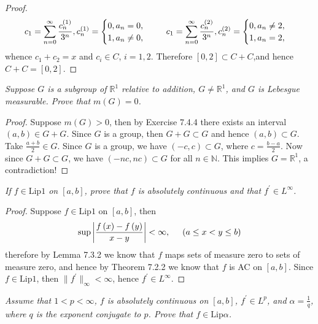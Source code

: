 \begin{proof}
$$
c_1=\sum_{n=0}^{\infty}{\frac{c_{n}^{\left( 1 \right)}}{3^n}},c_{n}^{\left( 1 \right)}=\begin{cases}
	0,a_n=0,\\
	1,a_n\ne 0,\\
\end{cases}\hspace{0.5cm}c_1=\sum_{n=0}^{\infty}{\frac{c_{n}^{\left( 2 \right)}}{3^n}},c_{n}^{\left( 2 \right)}=\begin{cases}
	0,a_n\ne 2,\\
	1,a_n=2,\\
\end{cases}
$$
whence $c_1+c_2=x$ and $c_i\in C$, $i=1,2$. Therefore $[0,2]\subset C+C$,and hence $C+C=[0,2]$.
\end{proof}
\begin{problem}\em
Suppose $G$ is a subgroup of $\mathbb{R}^1$ relative to addition, $G\ne\mathbb{R}^1$, and $G$ is Lebesgue measurable. Prove that $m(G)=0$.
\end{problem}
\begin{proof}
Suppose $m(G)>0$, then by Exercise 7.4.4 there exists an interval $(a,b)\in G+G$. Since $G$ is a group, then $G+G\subset G$ and hence $(a,b)\subset G$. Take $\frac{a+b}{2}\in G$. Since $G$ is a group, we have $(-c,c)\subset G$, where $c=\frac{b-a}{2}$. Now since $G+G\subset G$, we have $(-nc,nc)\subset G$ for all $n\in\mathbb{N}$. This implies $G=\mathbb{R}^1$, a contradiction!
\end{proof}
\begin{problem}\em
If $f\in\mathrm{Lip}1$ on $[a,b]$, prove that $f$ is absolutely continuous and that $f^\prime\in L^\infty$.
\end{problem}
\begin{proof}
Suppose $f\in\mathrm{Lip}1$ on $[a,b]$, then 
$$
\mathrm{sup}\left| \frac{f\left( x \right) -f\left( y \right)}{x-y} \right|<\infty ,\hspace{0.5cm}\left( a\le x<y\le b \right) 
$$
therefore by Lemma 7.3.2 we know that $f$ maps sets of measure zero to sets of measure zero, and hence by Theorem 7.2.2 we know that $f$ is AC on $[a,b]$. Since $f\in\mathrm{Lip}1$, then $\|f^\prime\|_\infty<\infty$, hence $f^\prime\in L^\infty$.
\end{proof}
\begin{problem}\em
Assume that $1<p<\infty$, $f$ is absolutely continuous on $[a,b]$, $f^\prime\in L^p$, and $\alpha=\frac{1}{q}$, where $q$ is the exponent conjugate to $p$. Prove that $f\in\mathrm{Lip}\alpha$.
\end{problem}
